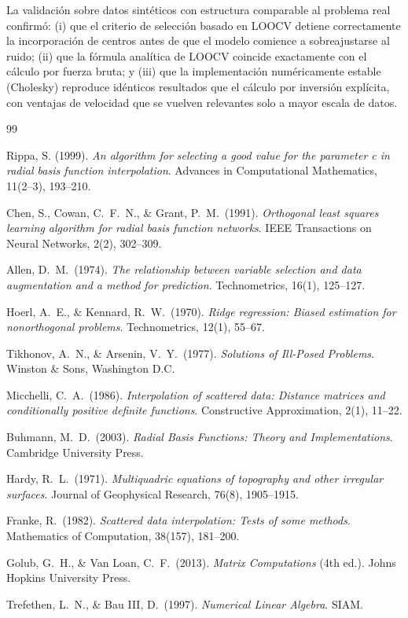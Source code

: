 \documentclass[11pt,a4paper]{article}
\begin{document}
La validaci\'on sobre datos sint\'eticos con estructura comparable al problema
real confirm\'o: (i) que el criterio de selecci\'on basado en LOOCV detiene
correctamente la incorporaci\'on de centros antes de que el modelo comience a
sobreajustarse al ruido; (ii) que la f\'ormula anal\'itica de LOOCV coincide
exactamente con el c\'alculo por fuerza bruta; y (iii) que la implementaci\'on
num\'ericamente estable (Cholesky) reproduce id\'enticos resultados que el
c\'alculo por inversi\'on expl\'icita, con ventajas de velocidad que se
vuelven relevantes solo a mayor escala de datos.

\begin{thebibliography}{99}

Rippa, S. (1999).
\emph{An algorithm for selecting a good value for the parameter c in radial
basis function interpolation}.
Advances in Computational Mathematics, 11(2--3), 193--210.

Chen, S., Cowan, C.\ F.\ N., \& Grant, P.\ M.\ (1991).
\emph{Orthogonal least squares learning algorithm for radial basis function
networks}.
IEEE Transactions on Neural Networks, 2(2), 302--309.

Allen, D.\ M.\ (1974).
\emph{The relationship between variable selection and data augmentation and
a method for prediction}.
Technometrics, 16(1), 125--127.

Hoerl, A.\ E., \& Kennard, R.\ W.\ (1970).
\emph{Ridge regression: Biased estimation for nonorthogonal problems}.
Technometrics, 12(1), 55--67.

Tikhonov, A.\ N., \& Arsenin, V.\ Y.\ (1977).
\emph{Solutions of Ill-Posed Problems}.
Winston \& Sons, Washington D.C.

Micchelli, C.\ A.\ (1986).
\emph{Interpolation of scattered data: Distance matrices and conditionally
positive definite functions}.
Constructive Approximation, 2(1), 11--22.

Buhmann, M.\ D.\ (2003).
\emph{Radial Basis Functions: Theory and Implementations}.
Cambridge University Press.

Hardy, R.\ L.\ (1971).
\emph{Multiquadric equations of topography and other irregular surfaces}.
Journal of Geophysical Research, 76(8), 1905--1915.

Franke, R.\ (1982).
\emph{Scattered data interpolation: Tests of some methods}.
Mathematics of Computation, 38(157), 181--200.

Golub, G.\ H., \& Van Loan, C.\ F.\ (2013).
\emph{Matrix Computations} (4th ed.).
Johns Hopkins University Press.

Trefethen, L.\ N., \& Bau III, D.\ (1997).
\emph{Numerical Linear Algebra}.
SIAM.

\end{thebibliography}
\end{document}
